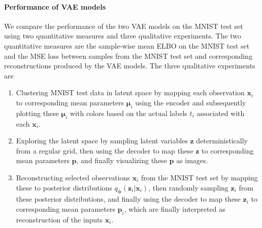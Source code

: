 \paragraph{Performance of VAE models}
We compare the performance of the two VAE models on the MNIST test set using two quantitative measures and three qualitative experiments. The two quantitative measures are the sample-wise mean ELBO on the MNIST test set and the MSE loss between samples from the MNIST test set and corresponding reconstructions produced by the VAE models. The three qualitative experiments are
\begin{enumerate}
    \item Clustering MNIST test data in latent space by mapping each observation $\mathbf{x}_i$ to corresponding mean parameters $\bm{\mu}_i$ using the encoder and subsequently plotting these $\bm{\mu}_i$ with colors based on the actual labels $t_i$ associated with each $\mathbf{x}_i$.
    \item Exploring the latent space by sampling latent variables $\mathbf{z}$ deterministically from a regular grid, then using the decoder to map these $\mathbf{z}$ to corresponding mean parameters $\mathbf{p}$,  and finally visualizing these $\mathbf{p}$ as images.
    \item Reconstructing selected observations $\mathbf{x}_i$ from the MNIST test set by mapping these to posterior distributions $q_{\bm{\phi}}(\mathbf{z}_i|\mathbf{x}_i)$, then randomly sampling $\mathbf{z}_i$ from these posterior distributions, and finally using the decoder to map these $\mathbf{z}_i$ to corresponding mean parameters $\mathbf{p}_i$, which are finally interpreted as reconstruction of the inputs $\mathbf{x}_i$.
\end{enumerate}
